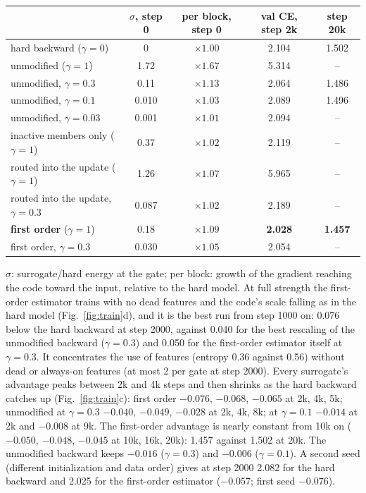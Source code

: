 \documentclass[10pt,a4paper]{article}
\begin{document}
\begin{center}\small
\begin{tabular}{lcccc}
\toprule
 & \(\sigma\), step 0 & per block, step 0 & val CE, step 2k & step 20k \\
\midrule
hard backward (\(\gamma=0\))                          & 0     & \(\times1.00\) & 2.104 & 1.502 \\
unmodified (\(\gamma=1\))                             & 1.72  & \(\times1.67\) & 5.314 & -- \\
unmodified, \(\gamma=0.3\)                            & 0.11  & \(\times1.13\) & 2.064 & 1.486 \\
unmodified, \(\gamma=0.1\)                            & 0.010 & \(\times1.03\) & 2.089 & 1.496 \\
unmodified, \(\gamma=0.03\)                           & 0.001 & \(\times1.01\) & 2.094 & -- \\
inactive members only (\(\gamma=1\))                  & 0.37  & \(\times1.02\) & 2.119 & -- \\
routed into the update (\(\gamma=1\))                 & 1.26  & \(\times1.07\) & 5.965 & -- \\
routed into the update, \(\gamma=0.3\)                & 0.087 & \(\times1.02\) & 2.189 & -- \\
\textbf{first order} (\(\gamma=1\))                   & 0.18  & \(\times1.09\) & \textbf{2.028} & \textbf{1.457} \\
first order, \(\gamma=0.3\)                           & 0.030 & \(\times1.05\) & 2.054 & -- \\
\bottomrule
\end{tabular}
\end{center}

\(\sigma\): surrogate/hard energy at the gate; per block: growth of the gradient reaching the code toward the input,
relative to the hard model.  At full strength the first-order estimator trains with no dead features and the
code's scale falling as in the hard model (Fig.~\ref{fig:train}d), and it is the best run from step 1000 on: 0.076 below
the hard backward at step 2000, against 0.040 for the best rescaling of the unmodified backward (\(\gamma=0.3\)) and
0.050 for the first-order estimator itself at \(\gamma=0.3\).  It concentrates the use of features (entropy 0.36
against 0.56) without dead or always-on features (at most 2 per gate at step 2000).  Every surrogate's advantage
peaks between 2k and 4k steps and then shrinks as the hard backward catches up (Fig.~\ref{fig:train}c): first order
\(-0.076\), \(-0.068\), \(-0.065\) at 2k, 4k, 5k; unmodified at \(\gamma=0.3\) \(-0.040\), \(-0.049\), \(-0.028\) at 2k, 4k, 8k;
at \(\gamma=0.1\) \(-0.014\) at 2k and \(-0.008\) at 9k.  The first-order advantage is nearly constant from 10k on
(\(-0.050\), \(-0.048\), \(-0.045\) at 10k, 16k, 20k): 1.457 against 1.502 at 20k.  The unmodified backward keeps
\(-0.016\) (\(\gamma=0.3\)) and \(-0.006\) (\(\gamma=0.1\)).  A second seed (different initialization and data order) gives
at step 2000 2.082 for the hard backward and 2.025 for the first-order estimator (\(-0.057\); first seed \(-0.076\)).
\end{document}
